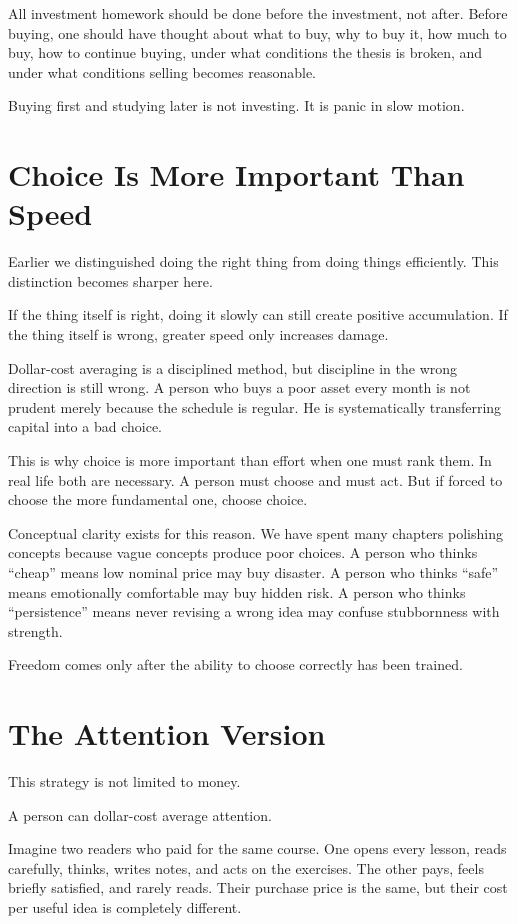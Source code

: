 All investment homework should be done before the investment, not after. Before buying, one should have thought about what to buy, why to buy it, how much to buy, how to continue buying, under what conditions the thesis is broken, and under what conditions selling becomes reasonable.

Buying first and studying later is not investing. It is panic in slow motion.

\section*{Choice Is More Important Than Speed}

Earlier we distinguished doing the right thing from doing things efficiently. This distinction becomes sharper here.

If the thing itself is right, doing it slowly can still create positive accumulation. If the thing itself is wrong, greater speed only increases damage.

Dollar-cost averaging is a disciplined method, but discipline in the wrong direction is still wrong. A person who buys a poor asset every month is not prudent merely because the schedule is regular. He is systematically transferring capital into a bad choice.

This is why choice is more important than effort when one must rank them. In real life both are necessary. A person must choose and must act. But if forced to choose the more fundamental one, choose choice.

Conceptual clarity exists for this reason. We have spent many chapters polishing concepts because vague concepts produce poor choices. A person who thinks ``cheap'' means low nominal price may buy disaster. A person who thinks ``safe'' means emotionally comfortable may buy hidden risk. A person who thinks ``persistence'' means never revising a wrong idea may confuse stubbornness with strength.

Freedom comes only after the ability to choose correctly has been trained.

\section*{The Attention Version}

This strategy is not limited to money.

A person can dollar-cost average attention.

Imagine two readers who paid for the same course. One opens every lesson, reads carefully, thinks, writes notes, and acts on the exercises. The other pays, feels briefly satisfied, and rarely reads. Their purchase price is the same, but their cost per useful idea is completely different.

